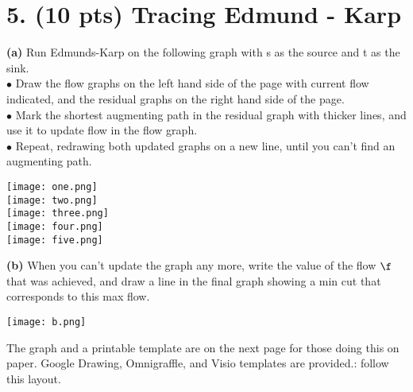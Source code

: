 \documentclass[12pt]{article}
\begin{document}
 \section*{5. (10 pts) Tracing Edmund - Karp} 
 \textbf{(a)} Run Edmunds-Karp on the following graph with s as the source and t as the sink. \\
 \linebreak
 $\bullet$ Draw the flow graphs on the left hand side of the page with current flow indicated, and the residual graphs on the right hand side of the page.  \\
 \linebreak
 $\bullet$ Mark the shortest augmenting path in the residual graph with thicker lines, and use it to update flow in the flow graph. \\
 \linebreak
 $\bullet$ Repeat, redrawing both updated graphs on a new line, until you can't find an augmenting path. \\
 \linebreak
 \begin{center}
 \texttt{[image: one.png]}\\
 \texttt{[image: two.png]}\\
 \texttt{[image: three.png]}\\
 \texttt{[image: four.png]}\\
 \texttt{[image: five.png]}\\
 \end{center}
 \textbf{(b)} When you can't update the graph any more, write the value of the flow $\f$ that was achieved, and draw a line in the final graph showing a min cut that corresponds to this max flow.  \\
 \linebreak
 \begin{center}
 \texttt{[image: b.png]}\\
 \end{center}
 \linebreak
 The graph and a printable template are on the next page for those doing this on paper. Google Drawing, Omnigraffle, and Visio templates are provided.: follow this layout. \\
\end{document}
